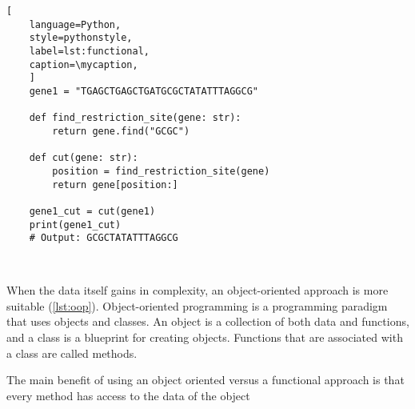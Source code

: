 \def\mycaption{ Example of functional programming in Python. The code
    defines a function called ``\texttt{find\_restriction\_site}'' that
    finds the position of a restriction site in a gene. The function
    ``\texttt{cut}'' uses the function ``\texttt{find\_restriction\_site}''
    to cut the gene at the restriction site.}
\begin{lstlisting}[
    language=Python,
    style=pythonstyle,
    label=lst:functional,
    caption=\mycaption,
    ]
    gene1 = "TGAGCTGAGCTGATGCGCTATATTTAGGCG"
    
    def find_restriction_site(gene: str):
        return gene.find("GCGC")
    
    def cut(gene: str):
        position = find_restriction_site(gene)
        return gene[position:]   
        
    gene1_cut = cut(gene1)
    print(gene1_cut)
    # Output: GCGCTATATTTAGGCG
    
    
\end{lstlisting}





When the data itself gains in complexity, an object-oriented approach is more
suitable (\autoref{lst:oop}). Object-oriented programming is a programming
paradigm that uses objects and classes. An object is a collection of both data
and functions, and a class is a blueprint for creating objects. Functions that
are associated with a class are called methods.


The main benefit of using an object oriented versus a
functional approach is that every method has access to the data of the
object

